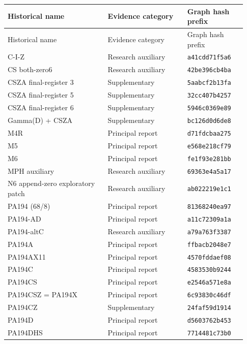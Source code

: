\begingroup\footnotesize
\begin{longtable}{@{}p{0.39\linewidth}p{0.31\linewidth}p{0.23\linewidth}@{}}
\toprule Historical name & Evidence category & Graph hash prefix\\\midrule\endfirsthead
\toprule Historical name & Evidence category & Graph hash prefix\\\midrule\endhead
C-I-Z & Research auxiliary & \texttt{a41cdd71f5a6}\\[3pt]
CS both-zero6 & Research auxiliary & \texttt{42be396cb4ba}\\[3pt]
CSZA final-register 3 & Supplementary & \texttt{5aabcf2b13fa}\\[3pt]
CSZA final-register 5 & Supplementary & \texttt{32cc407b4257}\\[3pt]
CSZA final-register 6 & Supplementary & \texttt{5946c0369e89}\\[3pt]
Gamma(D) + CSZA & Supplementary & \texttt{bc126d0d6de8}\\[3pt]
M4R & Principal report & \texttt{d71fdcbaa275}\\[3pt]
M5 & Principal report & \texttt{e568e218cf79}\\[3pt]
M6 & Principal report & \texttt{fe1f93e281bb}\\[3pt]
MPH auxiliary & Research auxiliary & \texttt{69363e4a5a17}\\[3pt]
N6 append-zero exploratory patch & Research auxiliary & \texttt{ab022219e1c1}\\[3pt]
PA194 (68/8) & Principal report & \texttt{81368240ea97}\\[3pt]
PA194-AD & Principal report & \texttt{a11c72309a1a}\\[3pt]
PA194-altC & Research auxiliary & \texttt{a79a763f3387}\\[3pt]
PA194A & Principal report & \texttt{ffbacb2048e7}\\[3pt]
PA194AX11 & Principal report & \texttt{4570fddaef08}\\[3pt]
PA194C & Principal report & \texttt{4583530b9244}\\[3pt]
PA194CS & Principal report & \texttt{e2546a571e8a}\\[3pt]
PA194CSZ = PA194X & Principal report & \texttt{6c93830c46df}\\[3pt]
PA194CZ & Supplementary & \texttt{24faf59d1914}\\[3pt]
PA194D & Principal report & \texttt{d5603762b453}\\[3pt]
PA194DHS & Principal report & \texttt{7714481c73b0}\\[3pt]

\end{longtable}
